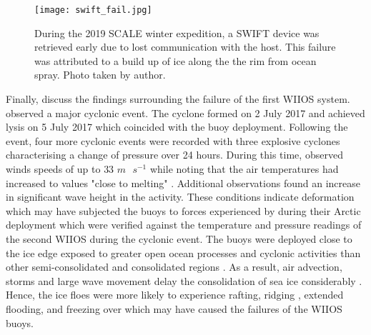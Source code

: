 \begin{figure}[H]
	\centering
	\texttt{[image: swift\_fail.jpg]}
	\caption{During the 2019 SCALE winter expedition, a SWIFT device was retrieved early due to lost communication with the host. This failure was attributed to a build up of ice along the the rim from ocean spray. Photo taken by author.}
	\label{fig:swift_fail}
\end{figure}

Finally, \textcite{vichi2019effects} discuss the findings surrounding the failure of the first WIIOS system. \textcite{vichi2019effects} observed a major cyclonic event. The cyclone formed on  2 July 2017 and achieved lysis on 5 July 2017 which coincided with the buoy deployment. Following the event, four more cyclonic events were recorded with three explosive cyclones \cite{vichi2019effects} characterising a change of pressure over 24 hours. During this time, \textcite{vichi2019effects} observed winds speeds of up to $33$ $m \text{ }s^{-1}$ while noting that the air temperatures had increased to values "close to melting" \cite{vichi2019effects}. Additional observations found an increase in significant wave height in the activity. These conditions indicate deformation \cite{vichi2019effects} which may have subjected the buoys to forces experienced by \cite{doble2017robust} during their Arctic deployment which were verified against the temperature and pressure readings of the second WIIOS during the cyclonic event. The buoys were deployed close to the ice edge exposed to greater open ocean processes and cyclonic activities than other semi-consolidated and consolidated regions \cite{vichi2019effects}. As a result, air advection, storms and large wave movement delay the consolidation of sea ice considerably \cite{vichi2019effects}. Hence, the ice floes were more likely to experience rafting, ridging \cite{icedefinition1992}, extended flooding, and freezing over which may have caused the failures of the WIIOS buoys.

